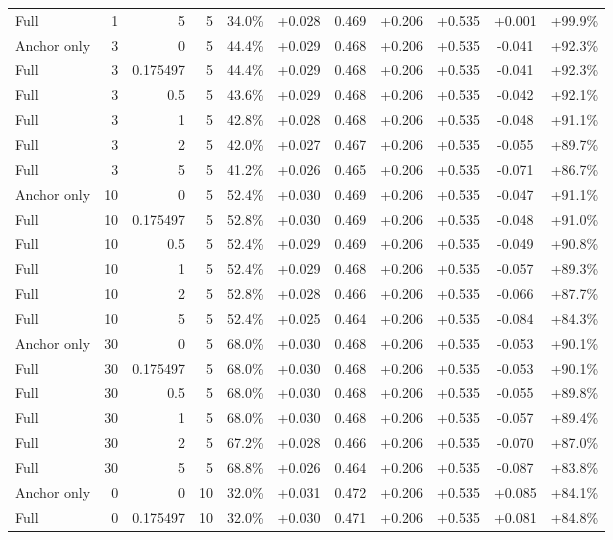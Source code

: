 \begin{table}[htbp]
\begin{tabular}{lrrrccccccc}
Full & 1 & 5 & 5 & 34.0\% & +0.028 & 0.469 & +0.206 & +0.535 & +0.001 & +99.9\% \\
Anchor only & 3 & 0 & 5 & 44.4\% & +0.029 & 0.468 & +0.206 & +0.535 & -0.041 & +92.3\% \\
Full & 3 & 0.175497 & 5 & 44.4\% & +0.029 & 0.468 & +0.206 & +0.535 & -0.041 & +92.3\% \\
Full & 3 & 0.5 & 5 & 43.6\% & +0.029 & 0.468 & +0.206 & +0.535 & -0.042 & +92.1\% \\
Full & 3 & 1 & 5 & 42.8\% & +0.028 & 0.468 & +0.206 & +0.535 & -0.048 & +91.1\% \\
Full & 3 & 2 & 5 & 42.0\% & +0.027 & 0.467 & +0.206 & +0.535 & -0.055 & +89.7\% \\
Full & 3 & 5 & 5 & 41.2\% & +0.026 & 0.465 & +0.206 & +0.535 & -0.071 & +86.7\% \\
Anchor only & 10 & 0 & 5 & 52.4\% & +0.030 & 0.469 & +0.206 & +0.535 & -0.047 & +91.1\% \\
Full & 10 & 0.175497 & 5 & 52.8\% & +0.030 & 0.469 & +0.206 & +0.535 & -0.048 & +91.0\% \\
Full & 10 & 0.5 & 5 & 52.4\% & +0.029 & 0.469 & +0.206 & +0.535 & -0.049 & +90.8\% \\
Full & 10 & 1 & 5 & 52.4\% & +0.029 & 0.468 & +0.206 & +0.535 & -0.057 & +89.3\% \\
Full & 10 & 2 & 5 & 52.8\% & +0.028 & 0.466 & +0.206 & +0.535 & -0.066 & +87.7\% \\
Full & 10 & 5 & 5 & 52.4\% & +0.025 & 0.464 & +0.206 & +0.535 & -0.084 & +84.3\% \\
Anchor only & 30 & 0 & 5 & 68.0\% & +0.030 & 0.468 & +0.206 & +0.535 & -0.053 & +90.1\% \\
Full & 30 & 0.175497 & 5 & 68.0\% & +0.030 & 0.468 & +0.206 & +0.535 & -0.053 & +90.1\% \\
Full & 30 & 0.5 & 5 & 68.0\% & +0.030 & 0.468 & +0.206 & +0.535 & -0.055 & +89.8\% \\
Full & 30 & 1 & 5 & 68.0\% & +0.030 & 0.468 & +0.206 & +0.535 & -0.057 & +89.4\% \\
Full & 30 & 2 & 5 & 67.2\% & +0.028 & 0.466 & +0.206 & +0.535 & -0.070 & +87.0\% \\
Full & 30 & 5 & 5 & 68.8\% & +0.026 & 0.464 & +0.206 & +0.535 & -0.087 & +83.8\% \\
Anchor only & 0 & 0 & 10 & 32.0\% & +0.031 & 0.472 & +0.206 & +0.535 & +0.085 & +84.1\% \\
Full & 0 & 0.175497 & 10 & 32.0\% & +0.030 & 0.471 & +0.206 & +0.535 & +0.081 & +84.8\% \\

\end{tabular}
\end{table}

